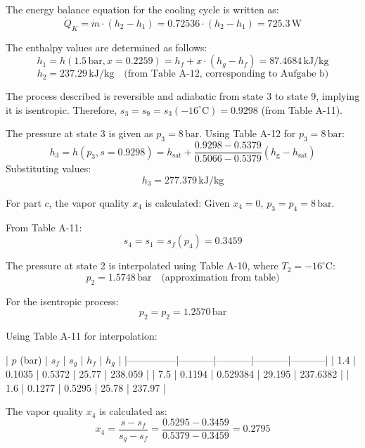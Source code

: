 The energy balance equation for the cooling cycle is written as:  
\[
\dot{Q}_K = \dot{m} \cdot (h_2 - h_1) = 0.72536 \cdot (h_2 - h_1) = 725.3 \, \text{W}
\]  

The enthalpy values are determined as follows:  
\[
h_1 = h(1.5 \, \text{bar}, x = 0.2259) = h_f + x \cdot (h_g - h_f) = 87.4684 \, \text{kJ/kg}
\]  
\[
h_2 = 237.29 \, \text{kJ/kg} \quad \text{(from Table A-12, corresponding to Aufgabe b)}
\]

The process described is reversible and adiabatic from state 3 to state 9, implying it is isentropic. Therefore, \( s_3 = s_9 = s_3(-16^\circ\text{C}) = 0.9298 \) (from Table A-11).  

The pressure at state 3 is given as \( p_3 = 8 \, \text{bar} \). Using Table A-12 for \( p_3 = 8 \, \text{bar} \):  
\[
h_3 = h(p_3, s = 0.9298) = h_{\text{sat}} + \frac{0.9298 - 0.5379}{0.5066 - 0.5379} (h_{\text{g}} - h_{\text{sat}})
\]
Substituting values:  
\[
h_3 = 277.379 \, \text{kJ/kg}
\]

For part \( c \), the vapor quality \( x_4 \) is calculated:  
Given \( x_4 = 0 \), \( p_3 = p_4 = 8 \, \text{bar} \).  

From Table A-11:  
\[
s_4 = s_1 = s_f(p_4) = 0.3459
\]

The pressure at state 2 is interpolated using Table A-10, where \( T_2 = -16^\circ\text{C} \):  
\[
p_2 = 1.5748 \, \text{bar} \quad \text{(approximation from table)}
\]

For the isentropic process:  
\[
p_2 = p_2 = 1.2570 \, \text{bar}
\]

Using Table A-11 for interpolation:  

| \( p \) (bar) | \( s_f \) | \( s_g \) | \( h_f \) | \( h_g \) |  
|---------------|-----------|-----------|-----------|-----------|  
| 1.4           | 0.1035    | 0.5372    | 25.77     | 238.059   |  
| 7.5           | 0.1194    | 0.529384  | 29.195    | 237.6382  |  
| 1.6           | 0.1277    | 0.5295    | 25.78     | 237.97    |  

The vapor quality \( x_4 \) is calculated as:  
\[
x_4 = \frac{s - s_f}{s_g - s_f} = \frac{0.5295 - 0.3459}{0.5379 - 0.3459} = 0.2795
\]